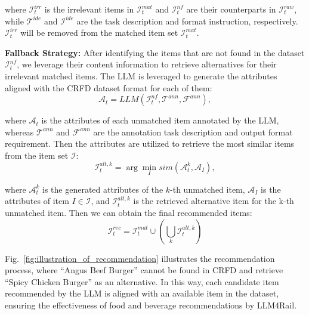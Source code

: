 \documentclass[runningheads]{llncs}
\begin{document}
\noindent where $\mathcal{I}_{t}^{irr}$ is the irrelevant items in $\mathcal{I}_{t}^{mat}$ and $\mathcal{I}_{t}^{nf}$ are their counterparts in $\mathcal{I}_{t}^{raw}$, while $\mathcal{T}^{ide}$ and $\mathcal{I}^{ide}$ are the task description and format instruction, respectively. $\mathcal{I}^{irr}_{t}$ will be removed from the matched item set $\mathcal{I}_{t}^{mat}$.


\indent \textbf{Fallback Strategy:} After identifying the items that are not found in the dataset $\mathcal{I}_{t}^{nf}$, we leverage their content information to retrieve alternatives for their irrelevant matched items.
The LLM is leveraged to generate the attributes aligned with the CRFD dataset format for each of them:
\begin{equation}
     \mathcal{A}_{t} = LLM(\mathcal{I}_{t}^{nf}, \mathcal{T}^{ann}, \mathcal{F}^{ann}),
    \label{eq_fallback_annotate}
\end{equation}

\noindent where $\mathcal{A}_{t}$ is the attributes of each unmatched item annotated by the LLM, whereas $\mathcal{T}^{ann}$ and $\mathcal{F}^{ann}$ are the annotation task description and output format requirement.
Then the attributes are utilized to retrieve the most similar items from the item set $\mathcal{I}$:
\begin{equation}
    \mathcal{I}_{t}^{alt,k} = \arg\min_{I}sim(\mathcal{A}_{t}^{k}, \mathcal{A}_{I}),
    \label{eq_fallback_retrieve}
\end{equation}

\noindent where $\mathcal{A}_{t}^{k}$ is the generated attributes of the $k$-th unmatched item, $\mathcal{A}_{I}$ is the attributes of item $I \in \mathcal{I}$, and $\mathcal{I}_{t}^{alt,k}$ is the retrieved alternative item for the k-th unmatched item. 
Then we can obtain the final recommended items:
\begin{equation}
    \mathcal{I}_{t}^{rec} = \mathcal{I}^{mat}_{t}\cup(\bigcup_{k}\mathcal{I}_{t}^{alt,k})
\end{equation}


Fig.~\ref{fig:illustration_of_recommendation} illustrates the recommendation process, where ``Angus Beef Burger'' cannot be found in CRFD and retrieve ``Spicy Chicken Burger'' as an alternative. 
In this way, each candidate item recommended by the LLM is aligned with an available item in the dataset, ensuring the effectiveness of food and beverage recommendations by LLM4Rail.
\end{document}
